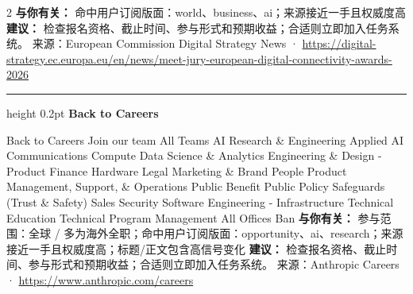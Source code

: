\documentclass[10.5pt]{ctexart}
\begin{document}
\begin{multicols}{2}
\textbf{与你有关：} 命中用户订阅版面：world、business、ai；来源接近一手且权威度高
\textbf{建议：} 检查报名资格、截止时间、参与形式和预期收益；合适则立即加入任务系统。
{\footnotesize\color{ormuted} 来源：European Commission Digital Strategy News · \url{https://digital-strategy.ec.europa.eu/en/news/meet-jury-european-digital-connectivity-awards-2026}}
\vspace{2mm}
\hrule height 0.2pt
\vspace{2mm}
{\large\bfseries Back to Careers}\par
Back to Careers Join our team All Teams AI Research \& Engineering Applied AI Communications Compute Data Science \& Analytics Engineering \& Design - Product Finance Hardware Legal Marketing \& Brand People Product Management, Support, \& Operations Public Benefit Public Policy Safeguards (Trust \& Safety) Sales Security Software Engineering - Infrastructure Technical Education Technical Program Management All Offices Ban
\textbf{与你有关：} 参与范围：全球 / 多为海外全职；命中用户订阅版面：opportunity、ai、research；来源接近一手且权威度高；标题/正文包含高信号变化
\textbf{建议：} 检查报名资格、截止时间、参与形式和预期收益；合适则立即加入任务系统。
{\footnotesize\color{ormuted} 来源：Anthropic Careers · \url{https://www.anthropic.com/careers}}
\end{multicols}
\end{document}
